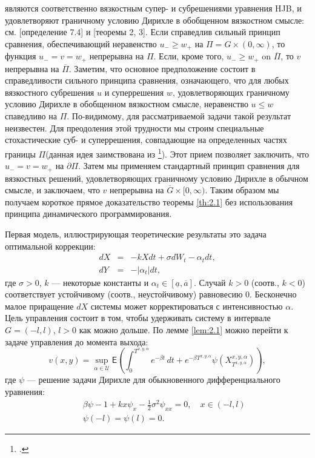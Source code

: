 \documentclass[twoside,12pt]{article}
\begin{document}
являются соответственно вязкостным супер- и субрешениями уравнения HJB, и удовлетворяют  граничному условию Дирихле в обобщенном вязкостном смысле: см.  [определение 7.4] и [теоремы 2, 3]. Если справедлив сильный принцип сравнения, обеспечивающий неравенство $u_-\ge w_+$ на $\Pi=G\times (0,\infty)$, то функция $u_-=v=w_+$ непрерывна на  $\Pi$. Если, кроме того, $u_-\ge w_+$ on $\overline\Pi$, то $v$ непрерывна на $\overline\Pi$. Заметим, что основное предположение  состоит в справедливости сильного принципа сравнения, означающего, что для любых вязкостного субрешения $u$ и суперрешения $w$, удовлетворяющих граничному условию Дирихле в обобщенном вязкостном смысле, неравенство $u\le w$ спаведливо на $\Pi$. По-видимому, для рассматриваемой задачи такой результат неизвестен. Для преодоления этой трудности мы строим специальные стохастические суб- и суперрешения, совпадающие на определенных частях границы $\Pi$(данная идея заимствована из \footcite{BayZha15}). Этот прием позволяет заключить, что $u_-=v=w_+$ на $\partial\Pi$. Затем мы применяем стандартный принцип сравнения для вязкостных решений, удовлетворяющих граничному условию Дирихле в обычном смысле, и заключаем, что $v$ непрерывна на $\overline G\times [0,\infty)$. Таким образом мы получаем короткое прямое доказательство теоремы \ref{th:2.1} без использования принципа динамического программирования.

Первая модель, иллюстрирующая теоретические результаты это задача оптимальной коррекции:
\begin{eqnarray*}
dX &=& -kXdt+\sigma dW_t-\alpha_t dt, \\
dY &=& -|\alpha_t|dt,
\end{eqnarray*}
где $\sigma>0$, $k$ --- некоторые константы и $\alpha_t\in [\underline a,\overline a]$. Случай $k>0$ (соотв., $k<0$) соответствует устойчивому (соотв., неустойчивому) равновесию $0$. Бесконечно малое приращение $dX$ системы может корректироваться с интенсивностью $\alpha$. Цель управления состоит в том, чтобы удерживать систему в интервале $G=(-l,l)$, $l>0$ как можно дольше. По лемме \ref{lem:2.1} можно перейти к задаче управления до момента выхода:
$$ v(x,y)=\sup_{\alpha\in\mathcal U}\mathsf E\left(\int_0^{T^{x,y,\alpha}} e^{-\beta t}\,dt+e^{-\beta T^{x,y,\alpha}}\psi(X_{T^{x,y,\alpha}}^{x,y,\alpha})\right),$$
где $\psi$ --- решение задачи Дирихле для обыкновенного дифференциального уравнения:
\begin{eqnarray*}
&&\beta \psi -1 +kx\psi_x-\frac{1}{2}\sigma^2 \psi_{xx}=0, \quad x \in (-l,l)\\
&& \psi(-l)=\psi(l)=0.
\end{eqnarray*}
\end{document}
